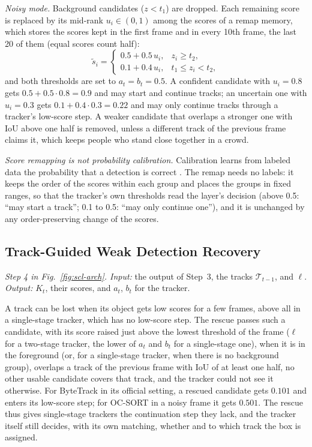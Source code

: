 \emph{Noisy mode.} Background candidates ($z<t_1$) are dropped. Each remaining score is replaced by its mid-rank $u_i\in(0,1)$ among the scores of a remap memory, which stores the scores kept in the first frame and in every 10th frame, the last 20 of them (equal scores count half):
\begin{equation}
\tilde{s}_i=
\begin{cases}
0.5+0.5\,u_i, & z_i\ge t_2,\\
0.1+0.4\,u_i, & t_1\le z_i<t_2,
\end{cases}
\label{eq:scl-remap}
\end{equation}
and both thresholds are set to $a_t=b_t=0.5$. A confident candidate with $u_i=0.8$ gets $0.5+0.5\cdot0.8=0.9$ and may start and continue tracks; an uncertain one with $u_i=0.3$ gets $0.1+0.4\cdot0.3=0.22$ and may only continue tracks through a tracker's low-score step. A weaker candidate that overlaps a stronger one with IoU above one half is removed, unless a different track of the previous frame claims it, which keeps people who stand close together in a crowd.

\emph{Score remapping is not probability calibration.} Calibration learns from labeled data the probability that a detection is correct \cite{kuppers2020detcalib}. The remap needs no labels: it keeps the order of the scores within each group and places the groups in fixed ranges, so that the tracker's own thresholds read the layer's decision (above 0.5: ``may start a track''; 0.1 to 0.5: ``may only continue one''), and it is unchanged by any order-preserving change of the scores.

\subsection{Track-Guided Weak Detection Recovery}\label{sec:scl-rescue}
\emph{Step 4 in Fig.~\ref{fig:scl-arch}. Input:} the output of Step~3, the tracks $\mathcal{T}_{t-1}$, and $\ell$. \emph{Output:} $K_t$, their scores, and $a_t$, $b_t$ for the tracker.

A track can be lost when its object gets low scores for a few frames, above all in a single-stage tracker, which has no low-score step. The rescue passes such a candidate, with its score raised just above the lowest threshold of the frame ($\ell$ for a two-stage tracker, the lower of $a_t$ and $b_t$ for a single-stage one), when it is in the foreground (or, for a single-stage tracker, when there is no background group), overlaps a track of the previous frame with IoU of at least one half, no other usable candidate covers that track, and the tracker could not see it otherwise. For ByteTrack in its official setting, a rescued candidate gets $0.101$ and enters its low-score step; for OC-SORT in a noisy frame it gets $0.501$. The rescue thus gives single-stage trackers the continuation step they lack, and the tracker itself still decides, with its own matching, whether and to which track the box is assigned.

